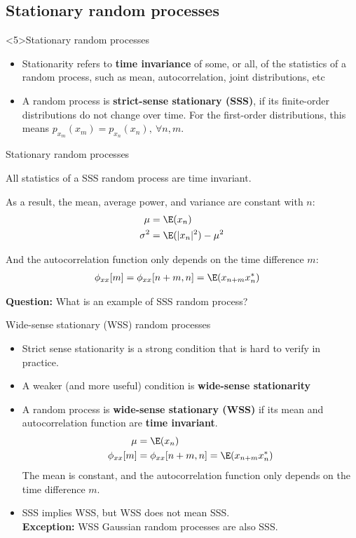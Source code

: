 \documentclass[10pt, aspectratio=169]{beamer}
\begin{document}
\subsection{Stationary random processes}
\begin{frame}<5>{Stationary random processes}
\begin{itemize}
	\item Stationarity refers to \textbf{time invariance} of some, or all, of the statistics of a random process, such as mean, autocorrelation, joint distributions, etc
	\item A random process is \textbf{strict-sense stationary (SSS)}, if its finite-order distributions do not change over time. For the first-order distributions, this means $p_{x_m}(x_m) = p_{x_n}(x_n),~\forall n, m$.
\end{itemize}
 
\centering
\resizebox{0.7\linewidth}{!}{}
\end{frame}

\begin{frame}{Stationary random processes}

All statistics of a SSS random process are time invariant. 

As a result, the mean, average power, and variance are constant with $n$:
\begin{align*}
\mu &= \E(x_n) \\
\sigma^2 &= \E(|x_n|^2) - \mu^2
\end{align*}

And the autocorrelation function only depends on the time difference $m$:
\begin{align*}
\phi_{xx}[m] &= \phi_{xx}[n+m, n] = \E(x_{n+m}x_n^*)
\end{align*}

\textbf{Question:} What is an example of SSS random process?

\end{frame}

\begin{frame}{Wide-sense stationary (WSS) random processes}

\begin{itemize}
	\item Strict sense stationarity is a strong condition that is hard to verify in practice.
	\pause\item A weaker (and more useful) condition is \textbf{wide-sense stationarity}
	\pause\item A random process is \textbf{wide-sense stationary (WSS)} if its mean and autocorrelation function are \textbf{time invariant}. 
	\begin{align*}
	\mu &= \E(x_n) \\
	\phi_{xx}[m] &= \phi_{xx}[n+m, n] = \E(x_{n+m}x_n^*)
	\end{align*}
	The mean is constant, and the autocorrelation function only depends on the time difference $m$.
	\pause\item SSS implies WSS, but WSS does not mean SSS. \\
	\textbf{Exception:} WSS Gaussian random processes are also SSS.	
\end{itemize}
\end{frame}
\end{document}
